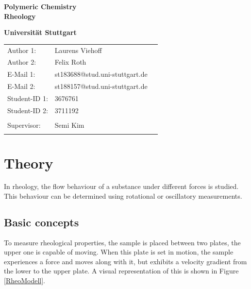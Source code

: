 \documentclass[10pt,a4paper,ngerman]{scrartcl}
\begin{document}
\begin{titlepage}
	\vspace*{2,5cm}
	\begin{center}
		\begin{LARGE}
			\textbf{Polymeric Chemistry}\\
			\textbf{Rheology}\\
		\end{LARGE}
		\vspace{1cm}
		\textbf{Universität Stuttgart}\\
		\vspace*{1,5cm}
		\begin{tabular}{lp{}l}
			Author 1:     & Laurens Viehoff\\
            Author 2:     & Felix Roth\\   
			E-Mail 1:     & st183688@stud.uni-stuttgart.de\\
            E-Mail 2:     & st188157@stud.uni-stuttgart.de  \\
			Student-ID 1: & 3676761   \\ 
            Student-ID 2: & 3711192 \\ \\
			Supervisor:    & Semi Kim   \\ \\ 
		\end{tabular}
	\end{center}
    
\end{titlepage}
\thispagestyle{empty}
\renewcommand{\thepage}{\arabic{page}}
\newpage
\tableofcontents
\setcounter{page}{1}
\renewcommand{\thepage}{\arabic{page}}
\newpage

\section{Theory}
		In rheology, the flow behaviour of a substance under different forces is studied. This behaviour can be determined using rotational or oscillatory measurements.
	
	\subsection{Basic concepts}
		To measure rheological properties, the sample is placed between two plates, the upper one is capable of moving. When this plate is set in motion, the 
		sample experiences a force and moves along with it, but exhibits a velocity gradient from the lower to the upper plate. A visual representation of this is shown 
		in Figure \ref{RheoModell}.
\end{document}
